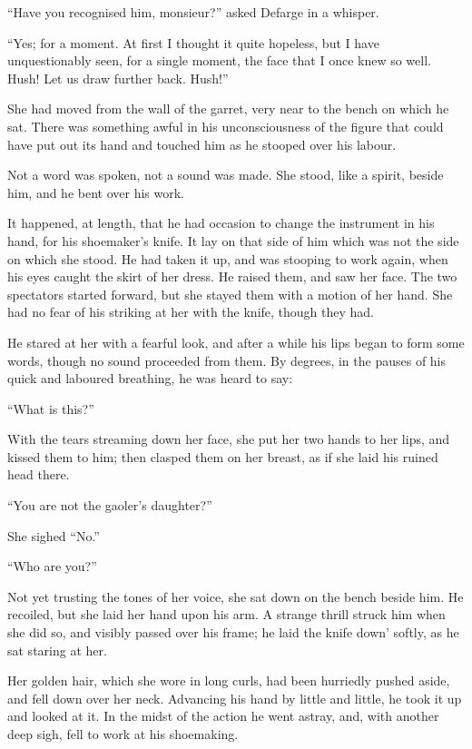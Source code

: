 ``Have you recognised him, monsieur?'' asked Defarge in a whisper.

``Yes; for a moment.  At first I thought it quite hopeless, but I have
unquestionably seen, for a single moment, the face that I once knew
so well.  Hush!  Let us draw further back.  Hush!''

She had moved from the wall of the garret, very near to the bench on
which he sat.  There was something awful in his unconsciousness of
the figure that could have put out its hand and touched him as he
stooped over his labour.

Not a word was spoken, not a sound was made.  She stood, like a
spirit, beside him, and he bent over his work.

It happened, at length, that he had occasion to change the instrument
in his hand, for his shoemaker's knife.  It lay on that side of him
which was not the side on which she stood.  He had taken it up, and
was stooping to work again, when his eyes caught the skirt of her
dress.  He raised them, and saw her face.  The two spectators started
forward, but she stayed them with a motion of her hand.  She had no
fear of his striking at her with the knife, though they had.

He stared at her with a fearful look, and after a while his lips
began to form some words, though no sound proceeded from them.  By
degrees, in the pauses of his quick and laboured breathing, he was
heard to say:

``What is this?''

With the tears streaming down her face, she put her two hands to her
lips, and kissed them to him; then clasped them on her breast, as if
she laid his ruined head there.

``You are not the gaoler's daughter?''

She sighed ``No.''

``Who are you?''

Not yet trusting the tones of her voice, she sat down on the bench
beside him.  He recoiled, but she laid her hand upon his arm.  A
strange thrill struck him when she did so, and visibly passed over
his frame; he laid the knife down' softly, as he sat staring at her.

Her golden hair, which she wore in long curls, had been hurriedly
pushed aside, and fell down over her neck.  Advancing his hand by
little and little, he took it up and looked at it.  In the midst of
the action he went astray, and, with another deep sigh, fell to work
at his shoemaking.

